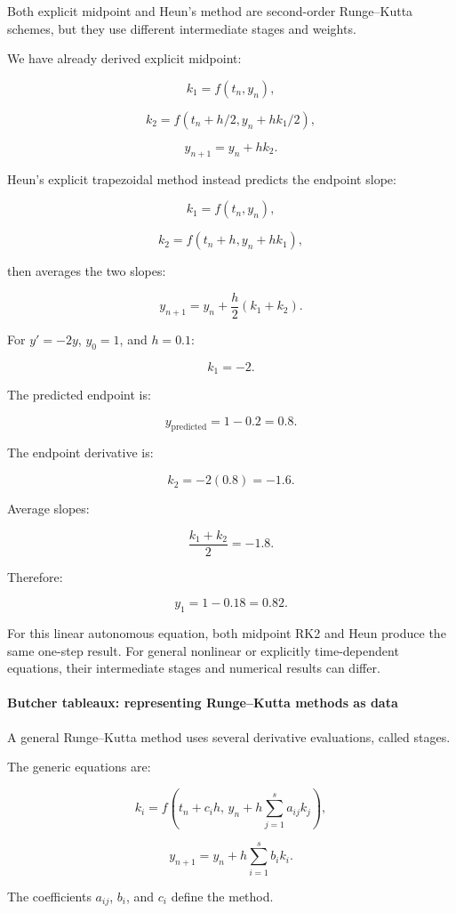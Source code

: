 Both explicit midpoint and Heun's method are second-order Runge--Kutta schemes, but they use different intermediate stages and weights.

We have already derived explicit midpoint:

\[
k_1=f(t_n,y_n),
\]

\[
k_2=f(t_n+h/2,y_n+hk_1/2),
\]

\[
y_{n+1}=y_n+hk_2.
\]

Heun's explicit trapezoidal method instead predicts the endpoint slope:

\[
k_1=f(t_n,y_n),
\]

\[
k_2=f(t_n+h,y_n+hk_1),
\]

then averages the two slopes:

\[
\boxed{ y_{n+1} = y_n+\frac h2(k_1+k_2) }.
\]

For \(y'=-2y\), \(y_0=1\), and \(h=0.1\):

\[
k_1=-2.
\]

The predicted endpoint is:

\[
y_{\mathrm{predicted}}=1-0.2=0.8.
\]

The endpoint derivative is:

\[
k_2=-2(0.8)=-1.6.
\]

Average slopes:

\[
\frac{k_1+k_2}{2}=-1.8.
\]

Therefore:

\[
y_1=1-0.18=\boxed{0.82}.
\]

For this linear autonomous equation, both midpoint RK2 and Heun produce the same one-step result. For general nonlinear or explicitly time-dependent equations, their intermediate stages and numerical results can differ.

\paragraph{Butcher tableaux: representing Runge--Kutta methods as data}\label{02-foundations-ii-ch025-butcher-tableaux-representing-rungekutta-methods-as-data}

A general Runge--Kutta method uses several derivative evaluations, called stages.

The generic equations are:

\[
k_i= f\left( t_n+c_ih,\, y_n+h\sum_{j=1}^{s}a_{ij}k_j \right),
\]

\[
\boxed{ y_{n+1} = y_n+h\sum_{i=1}^{s}b_ik_i }.
\]

The coefficients \(a_{ij}\), \(b_i\), and \(c_i\) define the method.


